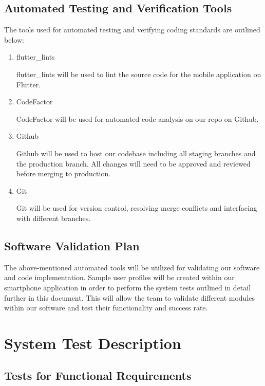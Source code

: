 \documentclass[12pt, titlepage]{article}
\begin{document}
\subsection{Automated Testing and Verification Tools}
The tools used for automated testing and verifying coding standards are outlined below:

\begin{enumerate}

\item flutter\_lints

\subitem flutter\_lints will be used to lint the source code for the mobile application on Flutter.

\item CodeFactor

\subitem CodeFactor will be used for automated code analysis on our repo on Github.

\item Github

\subitem Github will be used to host our codebase including all staging branches and the production branch. All changes will need to be approved and reviewed before merging to production.

\item Git

\subitem Git will be used for version control, resolving merge conflicts and interfacing with different branches.

\end{enumerate}

\subsection{Software Validation Plan}

The above-mentioned automated tools will be utilized for validating our software and code implementation. Sample user profiles will be created within our smartphone application in order to perform the system tests outlined in detail further in this document. This will allow the team to validate different modules within our software and test their functionality and success rate. 

\section{System Test Description}
	
\subsection{Tests for Functional Requirements}
\label{Section 5.1}
\end{document}
